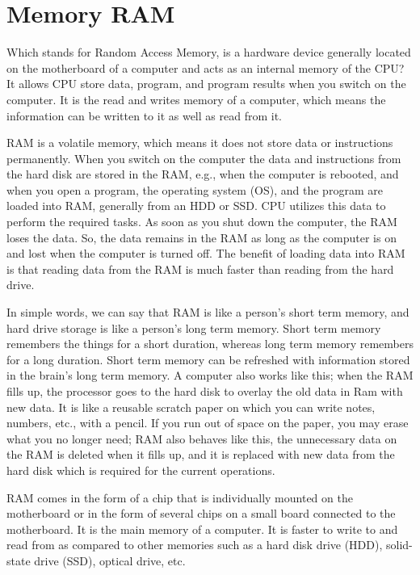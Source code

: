 \documentclass[11pt,a4paper,twoside]{article}
\begin{document}
\section{Memory RAM}
Which stands for Random Access Memory, is a hardware device generally located on the motherboard of a computer and acts as an internal memory of the CPU? It allows CPU store data, program, and program results when you switch on the computer. It is the read and writes memory of a computer, which means the information can be written to it as well as read from it.\par
RAM is a volatile memory, which means it does not store data or instructions permanently. When you switch on the computer the data and instructions from the hard disk are stored in the RAM, e.g., when the computer is rebooted, and when you open a program, the operating system (OS), and the program are loaded into RAM, generally from an HDD or SSD. CPU utilizes this data to perform the required tasks. As soon as you shut down the computer, the RAM loses the data. So, the data remains in the RAM as long as the computer is on and lost when the computer is turned off. The benefit of loading data into RAM is that reading data from the RAM is much faster than reading from the hard drive.\par
In simple words, we can say that RAM is like a person’s short term memory, and hard drive storage is like a person's long term memory. Short term memory remembers the things for a short duration, whereas long term memory remembers for a long duration. Short term memory can be refreshed with information stored in the brain’s long term memory. A computer also works like this; when the RAM fills up, the processor goes to the hard disk to overlay the old data in Ram with new data. It is like a reusable scratch paper on which you can write notes, numbers, etc., with a pencil. If you run out of space on the paper, you may erase what you no longer need; RAM also behaves like this, the unnecessary data on the RAM is deleted when it fills up, and it is replaced with new data from the hard disk which is required for the current operations.\par
RAM comes in the form of a chip that is individually mounted on the motherboard or in the form of several chips on a small board connected to the motherboard. It is the main memory of a computer. It is faster to write to and read from as compared to other memories such as a hard disk drive (HDD), solid-state drive (SSD), optical drive, etc.\par
\end{document}
